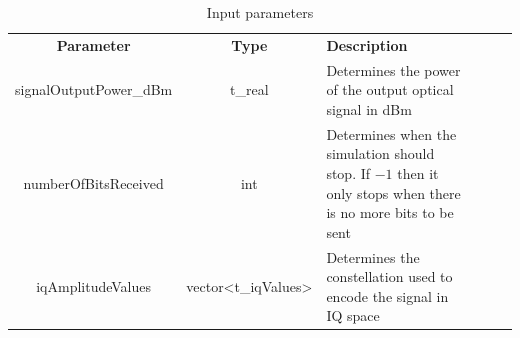 \begin{table}[h]
	\centering
	\caption{Input parameters}
	\begin{tabular}{|c|c|p{70mm}|ccp{70mm}}
		\cline{1-3}
		\textbf{Parameter} & \textbf{Type} & \textbf{Description} &    \\ \cline{1-3}
		signalOutputPower\_dBm & t\_real & Determines the power of the output optical signal in dBm &  \\ \cline{1-3}
		numberOfBitsReceived & int &   Determines when the simulation should stop. If $-1$ then it only stops when there is no more bits to be sent&   \\ \cline{1-3}
		iqAmplitudeValues & vector<t\_iqValues> & Determines the constellation used to encode the signal in IQ space &    \\ \cline{1-3}
	\end{tabular}
	\label{table:in_par}
\end{table}

